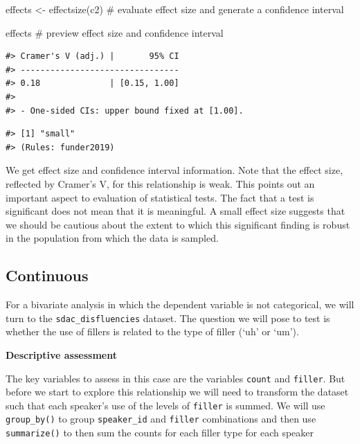 \documentclass[
  letterpaper,
]{latex/krantz}
\newenvironment{Shaded}{\begin{snugshade}}{\end{snugshade}}
\newcommand{\CommentTok}[1]{\textcolor[rgb]{0.37,0.37,0.37}{#1}}
\newcommand{\FunctionTok}[1]{\textcolor[rgb]{0.28,0.35,0.67}{#1}}
\newcommand{\NormalTok}[1]{\textcolor[rgb]{0.00,0.23,0.31}{#1}}
\newcommand{\OtherTok}[1]{\textcolor[rgb]{0.00,0.23,0.31}{#1}}
\newcommand{\SpecialCharTok}[1]{\textcolor[rgb]{0.37,0.37,0.37}{#1}}
\begin{document}
\begin{Shaded}
\begin{Highlighting}[]
\NormalTok{effects }\OtherTok{\textless{}{-}} \FunctionTok{effectsize}\NormalTok{(c2) }\CommentTok{\# evaluate effect size and generate a confidence interval}

\NormalTok{effects }\CommentTok{\# preview effect size and confidence interval}
\end{Highlighting}
\end{Shaded}

\begin{verbatim}
#> Cramer's V (adj.) |       95% CI
#> --------------------------------
#> 0.18              | [0.15, 1.00]
#> 
#> - One-sided CIs: upper bound fixed at [1.00].
\end{verbatim}

\begin{Shaded}
\end{Shaded}

\begin{verbatim}
#> [1] "small"
#> (Rules: funder2019)
\end{verbatim}

We get effect size and confidence interval information. Note that the
effect size, reflected by Cramer's V, for this relationship is weak.
This points out an important aspect to evaluation of statistical tests.
The fact that a test is significant does not mean that it is meaningful.
A small effect size suggests that we should be cautious about the extent
to which this significant finding is robust in the population from which
the data is sampled.

\hypertarget{continuous-1}{%
\subsection{Continuous}\label{continuous-1}}

For a bivariate analysis in which the dependent variable is not
categorical, we will turn to the \texttt{sdac\_disfluencies} dataset.
The question we will pose to test is whether the use of fillers is
related to the type of filler (`uh' or `um').

\textbf{Descriptive assessment}

The key variables to assess in this case are the variables
\texttt{count} and \texttt{filler}. But before we start to explore this
relationship we will need to transform the dataset such that each
speaker's use of the levels of \texttt{filler} is summed. We will use
\texttt{group\_by()} to group \texttt{speaker\_id} and \texttt{filler}
combinations and then use \texttt{summarize()} to then sum the counts
for each filler type for each speaker
\end{document}
